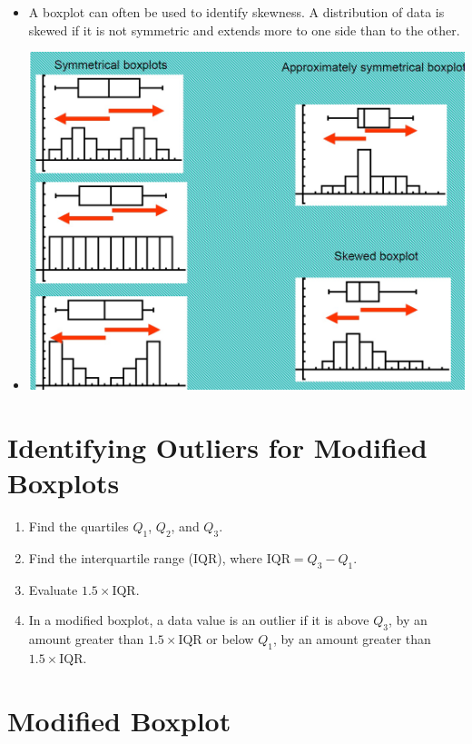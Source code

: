 \documentclass[]{book}
\providecommand{\tightlist}{%
  \setlength{\itemsep}{0pt}\setlength{\parskip}{0pt}}
\begin{document}
\begin{itemize}
\tightlist
\item
  A boxplot can often be used to identify skewness. A distribution of data is skewed if it is not symmetric and extends more to one side than to the other.
\item
  \includegraphics{pic16.png}
\end{itemize}

\hypertarget{identifying-outliers-for-modified-boxplots}{%
\section{Identifying Outliers for Modified Boxplots}\label{identifying-outliers-for-modified-boxplots}}

\begin{enumerate}
\def\labelenumi{\arabic{enumi}.}
\tightlist
\item
  Find the quartiles \(Q_1\), \(Q_2\), and \(Q_3\).
\item
  Find the interquartile range (IQR), where \(\textrm{IQR} = Q_3- Q_1\).
\item
  Evaluate \(1.5\times \textrm{IQR}\).
\item
  In a modified boxplot, a data value is an outlier if it is above \(Q_3\), by an amount greater than \(1.5\times \textrm{IQR}\) or below \(Q_1\), by an amount greater than \(1.5\times \textrm{IQR}\).
\end{enumerate}

\hypertarget{modified-boxplot}{%
\section{Modified Boxplot}\label{modified-boxplot}}
\end{document}

